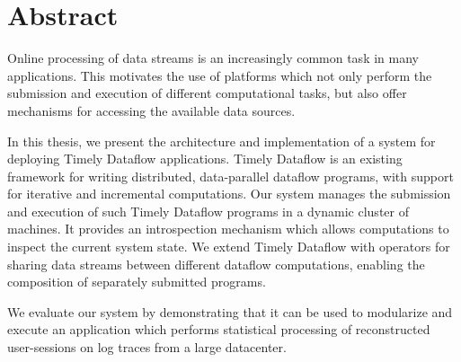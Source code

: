 \begingroup
\let\clearpage\relax
\let\cleardoublepage\relax
\let\cleardoublepage\relax

\chapter*{Abstract}

Online processing of data streams is an increasingly
common task in many applications. This motivates the use of platforms which
not only perform the submission and execution of different computational tasks,
but also offer mechanisms for accessing the available data sources.

In this thesis, we present the architecture and implementation of a system
for deploying Timely Dataflow applications. Timely Dataflow is an existing
framework for writing distributed, data-parallel dataflow programs, with
support for iterative and incremental computations.
Our system manages the submission and execution of such Timely Dataflow programs
in a dynamic cluster of machines. It provides an introspection mechanism
which allows computations to inspect the current system state.
We extend Timely Dataflow with operators for sharing data streams between
different dataflow computations, enabling the composition of separately submitted
programs.

We evaluate our system by demonstrating that it can be used to
modularize and execute an application which performs statistical
processing of reconstructed user-sessions on log traces from a large datacenter.

\endgroup
